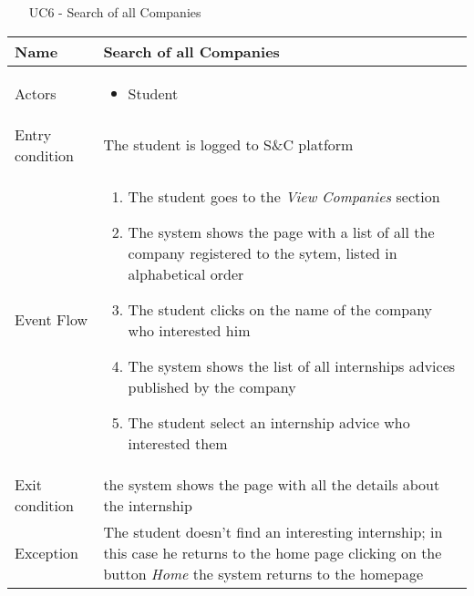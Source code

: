				
				\begin{table} [H]
					\centering
					\begin{itemize}
						\item [UC6] - Search of all Companies
					\end{itemize}
					\begin{tabular}{|| P{7.5cm} | P{7.5cm} ||}
						\hline
						Name & Search of all Companies \\
						\hline
						Actors & \parbox{5cm}{\begin{itemize}
								\item Student
							\end{itemize}
						} \\
						\hline
						Entry condition & The student is logged to S\&C platform  \\
						\hline
						Event Flow & \parbox{5cm}{\begin{enumerate}[label=\alpha]
								\item The student goes to the \textit{View 
									Companies} section
								\item The system shows the page with a 
								list of all the company registered to 
								the sytem, listed in alphabetical 
								order   
								\item The student clicks on the name of 
								the company who interested him
								\item The system shows the list of all 
								internships advices published by 
								the company 
								\item The student select an internship advice who 
								interested them
						\end{enumerate}} \\
						\hline 
						Exit condition &  the system shows the 
						page with all the details about the 
						internship \\
						\hline
						Exception & The student doesn’t find an interesting 
						internship; in this case he returns to the 
						home page clicking on the button \textit{Home}
						the system returns to the homepage 
						\\
						\hline
					\end{tabular}
				\end{table}
				
				
				
